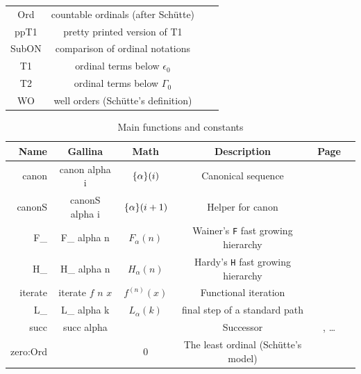 \documentclass[a4paper]{book}
\begin{document}
{\begin{table}[h]
\begin{threeparttable}
\begin{tabular}{|c|c|c|l|}
Ord & countable ordinals (after Schütte) & \pageref{types:Ord} \\
ppT1 & pretty printed version of T1 & \pageref{types:ppT1} \\
SubON & comparison of ordinal notations & \pageref{types:SubON} \\
T1 & ordinal terms below $\epsilon_0$ & \pageref{types:T1} \\
T2 & ordinal terms below $\Gamma_0$ & \pageref{types:T2} \\
WO & well orders (Schütte's definition) & \pageref{types:WO} \\
\hline
\end{tabular}
\end{threeparttable}
\end{table}

\begin{table}[h]
  \centering
  \begin{threeparttable}
    \caption{Main functions and constants}
\begin{tabular}{|r | c|c|c|c|l|}
\hline
Name & Gallina & Math & Description & Page \\ \hline
canon & canon alpha i & $\mbox{$\{\alpha\}(i)$}$& Canonical sequence & \pageref{Functions:canon}\\
canonS & canonS alpha i & $\mbox{$\{\alpha\}(i+1)$}$& Helper for canon & \pageref{Functions:canonS}\\
F\_ & F\_ alpha n & $F_\alpha(n)$ & Wainer's \texttt{F} fast growing hierarchy & \pageref{Functions:F-alpha} \\
H\_ & H\_ alpha n & $H_\alpha(n)$ & Hardy's \texttt{H} fast growing hierarchy & \pageref{Functions:H-alpha} \\
iterate & iterate $f$ $n$ $x$ & $f^{(n)}(x)$ & Functional iteration & \pageref{Functions:iterate} \\
L\_ & L\_ alpha k & $L_\alpha(k)$ & final step of a standard path & \pageref{Functions:L-alpha} \\
succ & succ alpha & & Successor & \pageref{Functions:succ-T1}, \pageref{Functions:succ-sch} \dots \\
zero:Ord & & $0$ & The least ordinal (Schütte's model) & \pageref{Constants:zero:Ord} \\


\hline
\end{tabular}
\end{threeparttable}
\end{table}



}
\end{document}
